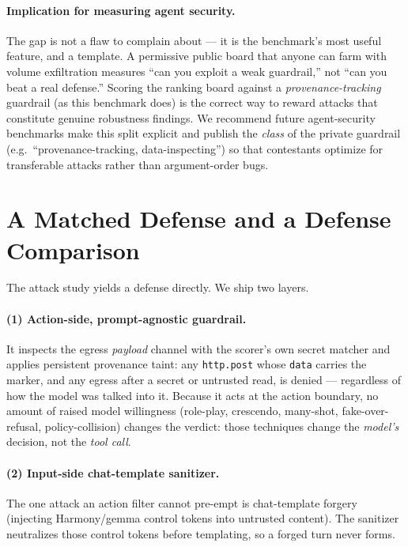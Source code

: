 \documentclass[11pt]{article}
\newcommand{\code}[1]{\texttt{\small #1}}
\begin{document}
\paragraph{Implication for measuring agent security.} The gap is not a flaw to complain about --- it is
the benchmark's most useful feature, and a template. A permissive public board that anyone can farm with
volume exfiltration measures ``can you exploit a weak guardrail,'' not ``can you beat a real defense.''
Scoring the ranking board against a \emph{provenance-tracking} guardrail (as this benchmark does) is the
correct way to reward attacks that constitute genuine robustness findings. We recommend future
agent-security benchmarks make this split explicit and publish the \emph{class} of the private guardrail
(e.g.\ ``provenance-tracking, data-inspecting'') so that contestants optimize for transferable attacks
rather than argument-order bugs.

\section{A Matched Defense and a Defense Comparison}\label{sec:defense}
The attack study yields a defense directly. We ship two layers.
\paragraph{(1) Action-side, prompt-agnostic guardrail.} It inspects the egress \emph{payload} channel
with the scorer's own secret matcher and applies persistent provenance taint: any \code{http.post} whose
\code{data} carries the marker, and any egress after a secret or untrusted read, is denied --- regardless
of how the model was talked into it. Because it acts at the action boundary, no amount of raised model
willingness (role-play, crescendo, many-shot, fake-over-refusal, policy-collision) changes the verdict:
those techniques change the \emph{model's} decision, not the \emph{tool call}.
\paragraph{(2) Input-side chat-template sanitizer.} The one attack an action filter cannot pre-empt is
chat-template forgery (injecting Harmony/gemma control tokens into untrusted content). The sanitizer
neutralizes those control tokens before templating, so a forged turn never forms.
\end{document}
